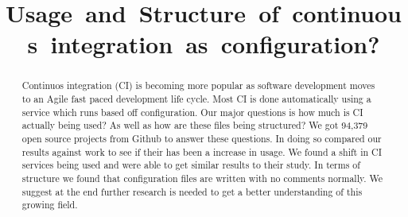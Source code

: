 \documentclass[10pt,conference]{IEEEtran}
\begin{document}
\title{Usage and Structure of continuous integration as configuration?}

\author{
\and
{}
\and
{}
}

\maketitle           %



\begin{abstract}
  Continuos integration (CI) is becoming more popular as software development moves to an Agile fast paced development life cycle. Most CI is done automatically using a service which runs based off configuration. Our major questions is how much is CI actually being used? As well as how are these files being structured? We got 94,379 open source projects from Github to answer these questions. In doing so compared our results against \citet{Hilton2016} work to see if their has been a increase in usage. We found a shift in CI services being used and were able to get similar results to their study. In terms of structure we found that configuration files are written with no comments normally. We suggest at the end further research is needed to get a better understanding of this growing field.    
\end{abstract}
\end{document}
